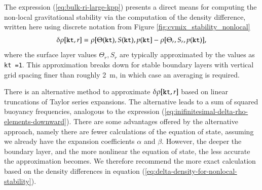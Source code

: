 The expression (\ref{eq:bulk-ri-large-kpp}) presents a direct means
for computing the non-local gravitational stability via the
computation of the density difference, written here using discrete
notation from Figure  \ref{fig:cvmix_stability_nonlocal}
\begin{equation}
 \delta\rho[{\tt kt},r]  = \rho[\Theta({\tt kt}), S({\tt kt}), p({\tt kt} ]  -\rho[\Theta_{r}, S_{r}, p({\tt kt})],
\label{eq:delta-density-for-nonlocal-stability}
\end{equation}
where the surface layer values $\Theta_{r}, S_{r}$ are typically
approximated by the values as {\tt kt =1}.  This approximation breaks
down for stable boundary layers with vertical grid spacing finer than
roughly 2~m, in which case an averaging is required.

There is an alternative method to approximate $\delta\rho[{\tt kt},r]$
based on linear truncations of Taylor series expansions.  The
alternative leads to a sum of squared buoyancy frequencies, analogous
to the expression
(\ref{eq:inifinitesimal-delta-rho-elements-downward}).  There are some
advantages offered by the alternative approach, namely there are fewer
calculations of the equation of state, assuming we already have the
expansion coefficients $\alpha$ and $\beta$.  However, the deeper the
boundary layer, and the more nonlinear the equation of state, the less
accurate the approximation becomes.  We therefore recommend the more
exact calculation based on the density differences in equation
(\ref{eq:delta-density-for-nonlocal-stability}).

